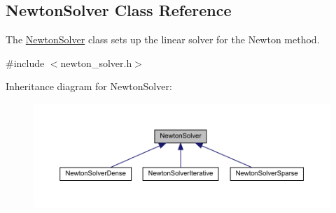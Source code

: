 \hypertarget{classamici_1_1_newton_solver}{}\subsection{Newton\+Solver Class Reference}
\label{classamici_1_1_newton_solver}


The \mbox{\hyperlink{classamici_1_1_newton_solver}{Newton\+Solver}} class sets up the linear solver for the Newton method.  




{\ttfamily \#include $<$newton\+\_\+solver.\+h$>$}



Inheritance diagram for Newton\+Solver\+:
\nopagebreak
\begin{figure}[H]
\begin{center}
\leavevmode
\includegraphics[width=350pt]{classamici_1_1_newton_solver__inherit__graph}
\end{center}
\end{figure}
